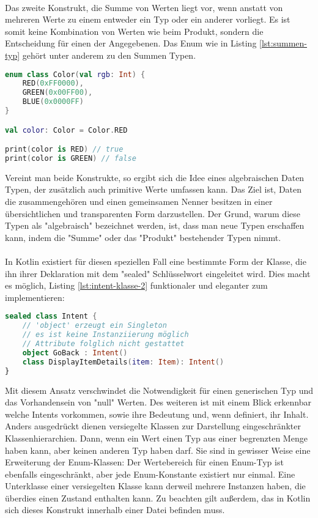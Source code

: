 \\
Das zweite Konstrukt, die Summe von Werten liegt vor, wenn anstatt von mehreren Werte zu einem entweder ein Typ oder ein anderer vorliegt. Es ist somit keine Kombination von Werten wie beim Produkt, sondern die Entscheidung für einen der Angegebenen. Das Enum wie in Listing
\ref{lst:summen-typ}
gehört unter anderem zu den Summen Typen.
\begin{lstlisting}[caption={Summen Typ}, label={lst:summen-typ}, language=Kotlin]
enum class Color(val rgb: Int) {
	RED(0xFF0000),
	GREEN(0x00FF00),
	BLUE(0x0000FF)
}

val color: Color = Color.RED

print(color is RED) // true
print(color is GREEN) // false
\end{lstlisting}
\bigskip
Vereint man beide Konstrukte, so ergibt sich die Idee eines algebraischen Daten Typen, der zusätzlich 
auch primitive Werte umfassen kann. Das Ziel ist, Daten die zusammengehören und einen gemeinsamen Nenner 
besitzen in einer übersichtlichen und transparenten Form darzustellen. Der Grund, warum diese Typen als 
"algebraisch" bezeichnet werden, ist, dass man neue Typen erschaffen kann, indem die "Summe" oder das 
"Produkt" bestehender Typen nimmt.
\\
\\
In Kotlin existiert für diesen speziellen Fall eine bestimmte Form der Klasse, die ihn ihrer Deklaration mit dem "sealed" Schlüsselwort eingeleitet wird. Dies macht es möglich, Listing 
\ref{lst:intent-klasse-2}
funktionaler und eleganter zum implementieren:
\begin{lstlisting}[caption={Intents als sealded class}, label={lst:intents-sealed-class}, language=Kotlin]
sealed class Intent {
	// 'object' erzeugt ein Singleton
	// es ist keine Instanziierung möglich
	// Attribute folglich nicht gestattet
	object GoBack : Intent()
	class DisplayItemDetails(item: Item): Intent()
}
\end{lstlisting}
\bigskip
Mit diesem Ansatz verschwindet die Notwendigkeit für einen generischen Typ und das Vorhandensein von 
"null" Werten. Des weiteren ist mit einem Blick erkennbar welche Intents vorkommen, sowie ihre Bedeutung 
und, wenn definiert, ihr Inhalt. Anders ausgedrückt dienen versiegelte Klassen zur Darstellung 
eingeschränkter Klassenhierarchien. Dann, wenn ein Wert einen Typ aus einer begrenzten Menge haben kann, 
aber keinen anderen Typ haben darf. Sie sind in gewisser Weise eine Erweiterung der Enum-Klassen: Der 
Wertebereich für einen Enum-Typ ist ebenfalls eingeschränkt, aber jede Enum-Konstante existiert nur 
einmal. Eine Unterklasse einer versiegelten Klasse kann derweil mehrere Instanzen haben, die überdies 
einen Zustand enthalten kann.
Zu beachten gilt außerdem, das in Kotlin sich dieses Konstrukt innerhalb einer Datei befinden muss.
\\
